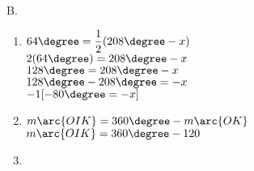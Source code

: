 B. \phantom{B} 
\begin{enumerate}[label = \arabic*. ]
\item $ 64 \degree = \dfrac{1}{2} (208 \degree -x) $ \redcheck \\
$ 2(64 \degree)  = 208 \degree -x $ \redcheck \\
$ 128 \degree  = 208 \degree -x $ \redcheck \\
$ 128 \degree - 208 \degree  =  -x $ \redcheck \\
$ -1[-80 \degree  =  -x ]$ \redcheck \\
 \redcheck 

\item $ m \arc{OIK} =360 \degree-m \arc{OK} $ \redcheck \\ 
$ m \arc{OIK} =360 \degree-120 $ \redcheck \\ 
 \redcheck 

\item {} \redcheck 


\end{enumerate} 